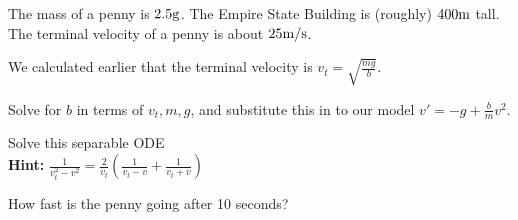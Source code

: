 \begin{applicationActivities}
\begin{observation}
The mass of a penny is \(2.5 {\rm g}\).  The Empire State Building is (roughly) \(400 {\rm m}\) tall.
\vfill
The terminal velocity of a penny is about \(25 {\rm m/s}\).
\end{observation}

\begin{activity}{20}
We calculated earlier that the terminal velocity is \(v_t = \sqrt{\frac{mg}{b}}\).  
\begin{subactivity}
Solve for \(b\) in terms of \(v_t,m,g\), and substitute this in to our model \(v'=-g+\frac{b}{m}v^2\).
\end{subactivity}
\begin{subactivity}
Solve this separable ODE \\
\textbf{Hint:} \(\frac{1}{v_t^2-v^2}=\frac{2}{v_t}\left(\frac{1}{v_t-v}+\frac{1}{v_t+v}\right)\)
\end{subactivity}
\begin{subactivity}
How fast is the penny going after 10 seconds?
\end{subactivity}
\end{activity}



\end{applicationActivities}
